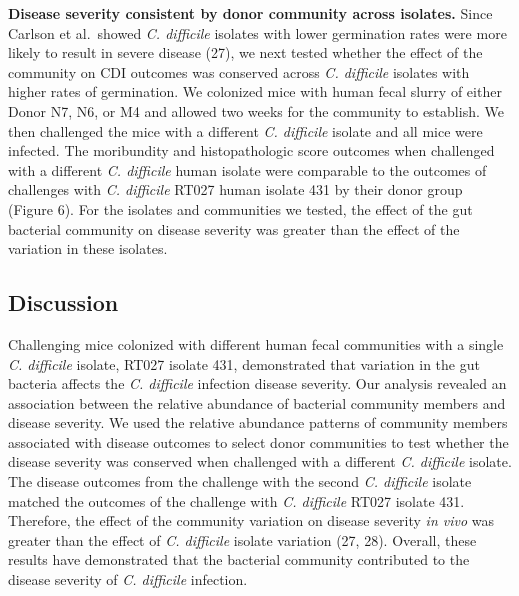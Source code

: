 \documentclass[
  12pt,
]{article}
\begin{document}
\textbf{Disease severity consistent by donor community across isolates.}
Since Carlson et al.~showed \emph{C. difficile} isolates with lower
germination rates were more likely to result in severe disease (27), we
next tested whether the effect of the community on CDI outcomes was
conserved across \emph{C. difficile} isolates with higher rates of
germination. We colonized mice with human fecal slurry of either Donor
N7, N6, or M4 and allowed two weeks for the community to establish. We
then challenged the mice with a different \emph{C. difficile} isolate
and all mice were infected. The moribundity and histopathologic score
outcomes when challenged with a different \emph{C. difficile} human
isolate were comparable to the outcomes of challenges with \emph{C.
difficile} RT027 human isolate 431 by their donor group (Figure 6). For
the isolates and communities we tested, the effect of the gut bacterial
community on disease severity was greater than the effect of the
variation in these isolates.

\hypertarget{discussion}{%
\subsection{Discussion}\label{discussion}}

Challenging mice colonized with different human fecal communities with a
single \emph{C. difficile} isolate, RT027 isolate 431, demonstrated that
variation in the gut bacteria affects the \emph{C. difficile} infection
disease severity. Our analysis revealed an association between the
relative abundance of bacterial community members and disease severity.
We used the relative abundance patterns of community members associated
with disease outcomes to select donor communities to test whether the
disease severity was conserved when challenged with a different \emph{C.
difficile} isolate. The disease outcomes from the challenge with the
second \emph{C. difficile} isolate matched the outcomes of the challenge
with \emph{C. difficile} RT027 isolate 431. Therefore, the effect of the
community variation on disease severity \emph{in vivo} was greater than
the effect of \emph{C. difficile} isolate variation (27, 28). Overall,
these results have demonstrated that the bacterial community contributed
to the disease severity of \emph{C. difficile} infection.
\end{document}
